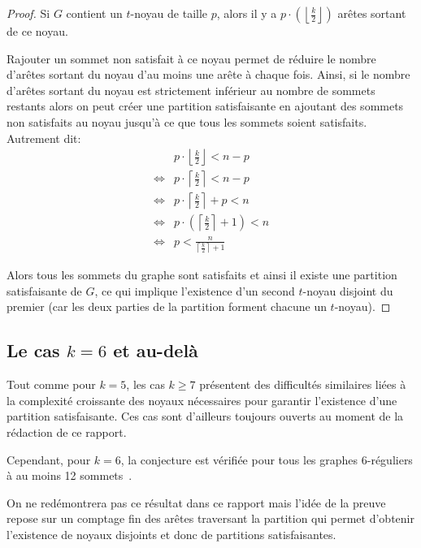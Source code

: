 \begin{proof}
    Si \(G\) contient un \(t\)-noyau de taille \(p\), alors il y a \(p \cdot \left( \left\lfloor \frac{k}{2} \right\rfloor \right)\) arêtes sortant de ce noyau.

    Rajouter un sommet non satisfait à ce noyau permet de réduire le nombre d'arêtes sortant du noyau d'au moins une arête à chaque fois.
    Ainsi, si le nombre d'arêtes sortant du noyau est strictement inférieur au nombre de sommets restants alors on peut créer une partition satisfaisante en ajoutant des sommets non satisfaits au noyau jusqu'à ce que tous les sommets soient satisfaits.
    Autrement dit:
    \begin{equation*}
        \begin{aligned}
            &p \cdot \left\lfloor \frac{k}{2} \right\rfloor < n - p \\
            \iff & p \cdot \left\lceil \frac{k}{2} \right\rceil < n - p \\
            \iff & p \cdot \left\lceil \frac{k}{2} \right\rceil + p < n \\
            \iff & p \cdot \left( \left\lceil \frac{k}{2} \right\rceil + 1 \right) < n \\
            \iff & p < \frac{n}{\left\lceil \frac{k}{2} \right\rceil + 1}
        \end{aligned}
    \end{equation*}

    Alors tous les sommets du graphe sont satisfaits et ainsi il existe une partition satisfaisante de \(G\), ce qui implique l'existence d'un second \(t\)-noyau disjoint du premier (car les deux parties de la partition forment chacune un \(t\)-noyau).
\end{proof}


\subsection{Le cas \(k = 6\) et au-delà}

Tout comme pour \(k = 5\), les cas \(k \geq 7\) présentent des difficultés similaires liées à la complexité croissante des noyaux nécessaires pour garantir l'existence d'une partition satisfaisante.
Ces cas sont d'ailleurs toujours ouverts au moment de la rédaction de ce rapport.

Cependant, pour \(k = 6\), la conjecture est vérifiée pour tous les graphes 6-réguliers à au moins 12 sommets~\cite{barnkopf2024note}.

On ne redémontrera pas ce résultat dans ce rapport mais l'idée de la preuve repose sur un comptage fin des arêtes traversant la partition qui permet d'obtenir l'existence de noyaux disjoints et donc de partitions satisfaisantes.